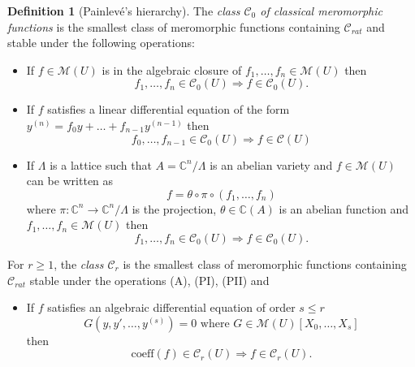 \documentclass[12pt]{amsart}
\theoremstyle{definition}
\newtheorem{definition}{Definition}[subsection]
\theoremstyle{plain}
\theoremstyle{exampstyle}
\theoremstyle{exampstyle}\newtheorem{thmxbis}{Theorem}
\numberwithin{equation}{section}
\theoremstyle{remark}
\begin{document}
\begin{definition}[Painlevé's hierarchy]\label{definition-newmeromorphic}  The {\em{class $\mathcal C_0$ of classical meromorphic functions}} is the smallest class of meromorphic functions containing $\mathcal C_{rat}$ and stable under the following operations: 
\begin{itemize} 
\item[(A)] If $f \in \mathcal M(U)$ is in the algebraic closure of $f_1,\ldots, f_n \in \mathcal M(U)$ then
$$ f_1,\ldots, f_n \in \mathcal C_0(U) \Rightarrow f \in \mathcal C_0(U).$$

\item[(PI)] If $f$ satisfies a linear differential equation of the form $y^{(n)} = f_0y + \ldots + f_{n-1}y^{(n-1)}$ then 
$$f_0, \ldots, f_{n-1} \in \mathcal C_0(U) \Rightarrow f \in \mathcal C(U)$$

\item[(PII)] If $\Lambda$ is a lattice such that $A = \mathbb{C}^n/\Lambda$ is an abelian variety and $f \in \mathcal M(U)$ can be written as 
$$ f = \theta \circ  \pi \circ (f_1,\ldots, f_n)$$
where $\pi : \mathbb{C}^n \rightarrow \mathbb{C}^n/\Lambda$ is the projection, $\theta \in \mathbb{C}(A)$ is an abelian function and $f_1,\ldots, f_n \in \mathcal M(U)$ then 
$$ f_1,\ldots, f_n \in \mathcal C_0(U) \Rightarrow f \in \mathcal C_0(U).$$
\end{itemize} 

For $r \geq 1$, the {\em{class $\mathcal C_r$}} is the smallest class of meromorphic functions containing $\mathcal C_{rat}$ stable under the operations (A), (PI), (PII) and 
\begin{itemize} 
\item[(PIII$_r$)] If $f$ satisfies an algebraic differential equation of order $s \leq r$ 
$$ G(y,y',\ldots, y^{(s)}) = 0 \text{ where } G \in \mathcal M(U)[X_0,\ldots, X_s]$$
then 
$$ \mathrm{coeff}(f) \in \mathcal C_r(U) \Rightarrow f \in \mathcal C_r(U).$$
\end{itemize} 
\end{definition} 
\end{document}
